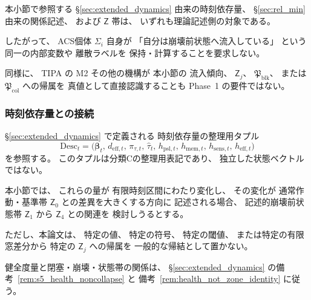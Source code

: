 \begin{remark}[流入傾向は分類Cの記述である]
\label{rem:inflow_description_level}
本小節で参照する
\S\ref{sec:extended_dynamics} 由来の時刻依存量、
\S\ref{sec:rel_min} 由来の関係記述、
および
$\mathsf{Z}$ 帯は、
いずれも理論記述側の対象である。

したがって、
ACS個体 $\Sigma_i$ 自身が
「自分は崩壊前状態へ流入している」
という同一の内部変数や
離散ラベルを
保持・計算することを要求しない。

同様に、
TIPA の M2 その他の機構が
本小節の
流入傾向、
$\mathsf{Z}_j$、
$\mathfrak{P}_{\mathrm{blk}}$、
または
$\mathfrak{P}_{\mathrm{col}}$
への帰属を
真値として直接認識することも
Phase~1 の要件ではない。
\end{remark}

\subsubsection{時刻依存量との接続}

\begin{remark}
\label{rem:internal_inflow_types}
\S\ref{sec:extended_dynamics} で定義される
時刻依存量の整理用タプル
\[
  \mathrm{Desc}_t
  =
  \bigl(
    \boldsymbol{\beta}_t,\,
    d_{\mathrm{eff},t},\,
    \pi_{\tau,t},\,
    \widehat{\tau}_{t},\,
    h_{\mathrm{psl},t},\,
    h_{\mathrm{mem},t},\,
    h_{\mathrm{sens},t},\,
    h_{\mathrm{eff},t}
  \bigr)
\]
を参照する。
このタプルは分類Cの整理用表記であり、
独立した状態ベクトルではない。

本小節では、
これらの量が
有限時刻区間にわたり変化し、
その変化が
通常作動・基準帯
$\mathsf{Z}_0$
との差異を大きくする方向に
記述される場合、
記述的崩壊前状態帯
$\mathsf{Z}_1$ から
$\mathsf{Z}_4$
との関連を
検討しうるとする。

ただし、本論文は、
特定の値、
特定の符号、
特定の閾値、
または特定の有限窓差分から
特定の
$\mathsf{Z}_j$
への帰属を
一般的な帰結として置かない。
\end{remark}

健全度量と閉塞・崩壊・状態帯の関係は、
\S\ref{sec:extended_dynamics} の備考~\ref{rem:s5_health_noncollapse} と
備考~\ref{rem:health_not_zone_identity} に従う。

